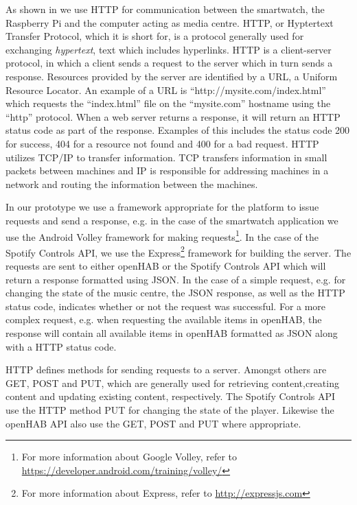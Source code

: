 As shown in  we use HTTP for communication between the smartwatch, the Raspberry Pi and the computer acting as media centre. HTTP, or Hyptertext Transfer Protocol, which it is short for, is a protocol generally used for exchanging \emph{hypertext}, text which includes hyperlinks. HTTP is a client-server protocol, in which a client sends a request to the server which in turn sends a response. Resources provided by the server are identified by a URL, a Uniform Resource Locator. An example of a URL is ``http://mysite.com/index.html'' which requests the ``index.html'' file on the ``mysite.com'' hostname using the ``http'' protocol. When a web server returns a response, it will return an HTTP status code as part of the response. Examples of this includes the status code 200 for success, 404 for a resource not found and 400 for a bad request. HTTP utilizes TCP/IP to transfer information. TCP transfers information in small packets between machines and IP is responsible for addressing machines in a network and routing the information between the machines.

In our prototype we use a framework appropriate for the platform to issue requests and send a response, e.g. in the case of the smartwatch application we use the Android Volley framework for making requests\footnote{For more information about Google Volley, refer to \url{https://developer.android.com/training/volley/}}. In the case of the Spotify Controls API, we use the Express\footnote{For more information about Express, refer to \url{http://expressjs.com}} framework for building the server. The requests are sent to either openHAB or the Spotify Controls API which will return a response formatted using JSON. In the case of a simple request, e.g. for changing the state of the music centre, the JSON response, as well as the HTTP status code, indicates whether or not the request was successful. For a more complex request, e.g. when requesting the available items in openHAB, the response will contain all available items in openHAB formatted as JSON along with a HTTP status code.

HTTP defines methods for sending requests to a server. Amongst others are GET, POST and PUT, which are generally used for retrieving content,creating content and updating existing content, respectively. The Spotify Controls API use the HTTP method PUT for changing the state of the player. Likewise the openHAB API also use the GET, POST and PUT where appropriate.


